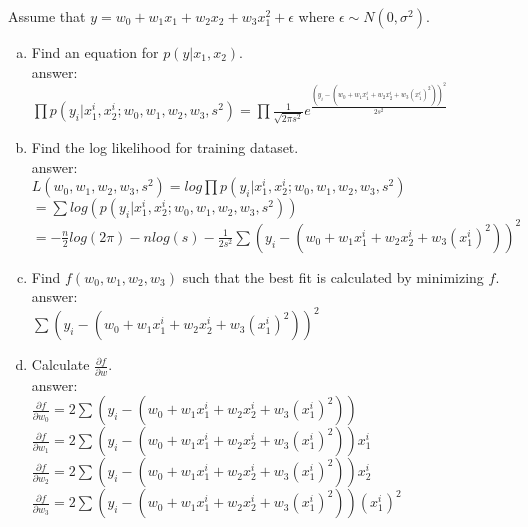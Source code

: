 \documentclass[11pt,letterpaper]{article}
\begin{document}
\begin{exercise}
Assume that $y = w_0 + w_1x_1 + w_2x_2 + w_3x_1^2 + \epsilon$ where $\epsilon \sim N(0, \sigma^2)$.
    \begin{enumerate}[(a)]
        \item Find an equation for $p(y|x_1, x_2)$.
        \\ answer:
        \\ $\prod{p(y_i|x_1^i, x_2^i;w_0, w_1, w_2, w_3, s^2)} = \prod{\frac{1}{\sqrt{2\pi s^2}}e^{\frac{(y_i - (w_0 + w_1x_1^i + w_2x_2^i + w_3(x_1^i)^2))^2}{2s^2}}}$
        
        \item Find the log likelihood for training dataset.
        \\ answer:
        \\ $L(w_0, w_1, w_2, w_3, s^2) = log\prod{p(y_i|x_1^i, x_2^i;w_0, w_1, w_2, w_3, s^2)}$
        \\ $ = \sum{log({p(y_i|x_1^i, x_2^i;w_0, w_1, w_2, w_3, s^2)})}$
        \\ $ = -\frac{n}{2}log(2\pi) - nlog(s) - \frac{1}{2s^2}\sum{(y_i - (w_0 + w_1x_1^i + w_2x_2^i + w_3(x_1^i)^2))^2}$
        
        \item Find $f(w_0, w_1, w_2, w_3)$ such that the best fit is calculated by minimizing $f$.
        \\ answer:
        \\ $\sum{(y_i - (w_0 + w_1x_1^i + w_2x_2^i + w_3(x_1^i)^2))^2}$
        
        \item Calculate $\frac{\partial{f}}{\partial{w}}$.
        \\ answer:
        \\ $\frac{\partial{f}}{\partial{w_0}} = 2\sum{(y_i - (w_0 + w_1x_1^i + w_2x_2^i + w_3(x_1^i)^2))}$
        \\ $\frac{\partial{f}}{\partial{w_1}} = 2\sum{(y_i - (w_0 + w_1x_1^i + w_2x_2^i + w_3(x_1^i)^2))x_1^i}$
        \\ $\frac{\partial{f}}{\partial{w_2}} = 2\sum{(y_i - (w_0 + w_1x_1^i + w_2x_2^i + w_3(x_1^i)^2))x_2^i}$
        \\ $\frac{\partial{f}}{\partial{w_3}} = 2\sum{(y_i - (w_0 + w_1x_1^i + w_2x_2^i + w_3(x_1^i)^2))(x_1^i)^2}$
    \end{enumerate}
\end{exercise}
\end{document}
